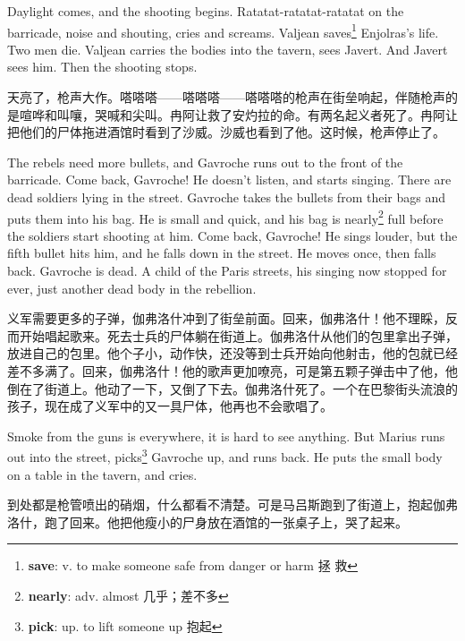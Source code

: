 \documentclass[fontset=ubuntu, zihao=5]{ctexart}
\begin{document}
\begin{paracol}{2}
\switchcolumn*

Daylight comes, and the shooting begins. Ratatat-ratatat-ratatat on the
barricade, noise and shouting, cries and screams. Valjean
saves\footnote{\textbf{save}: v. to make someone safe from danger or harm 拯
  救} Enjolras's life. Two men die. Valjean carries the bodies into the
tavern, sees Javert. And Javert sees him. Then the shooting stops.

\switchcolumn

天亮了，枪声大作。嗒嗒嗒——嗒嗒嗒——嗒嗒嗒的枪声在街垒响起，伴随枪声的是喧哗和叫嚷，哭喊和尖叫。冉阿让救了安灼拉的命。有两名起义者死了。冉阿让把他们的尸体拖进酒馆时看到了沙威。沙威也看到了他。这时候，枪声停止了。

\switchcolumn*

The rebels need more bullets, and Gavroche runs out to the front of the barricade. Come back, Gavroche! He doesn't listen, and starts singing. There are dead soldiers lying in the street. Gavroche takes the bullets from their bags and puts them into his bag. He is small and quick, and his bag is nearly\footnote{\textbf{nearly}: adv. almost 几乎；差不多}
 full before the soldiers start shooting at him. Come back, Gavroche! He sings louder, but the fifth bullet hits him, and he falls down in the street. He moves once, then falls back. Gavroche is dead. A child of the Paris streets, his singing now stopped for ever, just another dead body in the rebellion.

\switchcolumn

义军需要更多的子弹，伽弗洛什冲到了街垒前面。回来，伽弗洛什！他不理睬，反而开始唱起歌来。死去士兵的尸体躺在街道上。伽弗洛什从他们的包里拿出子弹，放进自己的包里。他个子小，动作快，还没等到士兵开始向他射击，他的包就已经差不多满了。回来，伽弗洛什！他的歌声更加嘹亮，可是第五颗子弹击中了他，他倒在了街道上。他动了一下，又倒了下去。伽弗洛什死了。一个在巴黎街头流浪的孩子，现在成了义军中的又一具尸体，他再也不会歌唱了。

\switchcolumn*

 Smoke from the guns is everywhere, it is hard to see anything. But Marius
 runs out into the street, picks\footnote{\textbf{pick}: up. to lift someone
   up 抱起} Gavroche up, and runs back. He puts the small body on a table in
 the tavern, and cries.

\switchcolumn

到处都是枪管喷出的硝烟，什么都看不清楚。可是马吕斯跑到了街道上，抱起伽弗洛什，跑了回来。他把他瘦小的尸身放在酒馆的一张桌子上，哭了起来。


\end{paracol}
\end{document}
